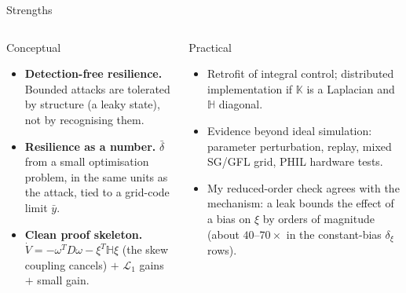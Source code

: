 \documentclass[aspectratio=169,9pt]{beamer}
\newcommand{\bbK}{\mathbb{K}}
\newcommand{\bbH}{\mathbb{H}}
\newcommand{\Lone}{\mathcal{L}_1}
\begin{document}
\begin{frame}[t]{Strengths}
\footnotesize
\begin{columns}[T]
\begin{block}{Conceptual}
\begin{itemize}
\item \textbf{Detection-free resilience.} Bounded attacks are tolerated by structure (a leaky state), not by recognising them.
\item \textbf{Resilience as a number.} $\bar\delta$ from a small optimisation problem, in the same units as the attack, tied to a grid-code limit $\bar y$.
\item \textbf{Clean proof skeleton.} $\dot V=-\omega^TD\omega-\xi^T\bbH\xi$ (the skew coupling cancels) $+$ $\Lone$ gains $+$ small gain.
\end{itemize}
\end{block}
\begin{block}{Practical}
\begin{itemize}
\item Retrofit of integral control; distributed implementation if $\bbK$ is a Laplacian and $\bbH$ diagonal.
\item Evidence beyond ideal simulation: parameter perturbation, replay, mixed SG/GFL grid, PHIL hardware tests.
\item My reduced-order check agrees with the mechanism: a leak bounds the effect of a bias on $\xi$ by orders of magnitude (about $40$--$70\times$ in the constant-bias $\delta_\xi$ rows).
\end{itemize}
\end{block}
\end{columns}
\end{frame}
\end{document}
